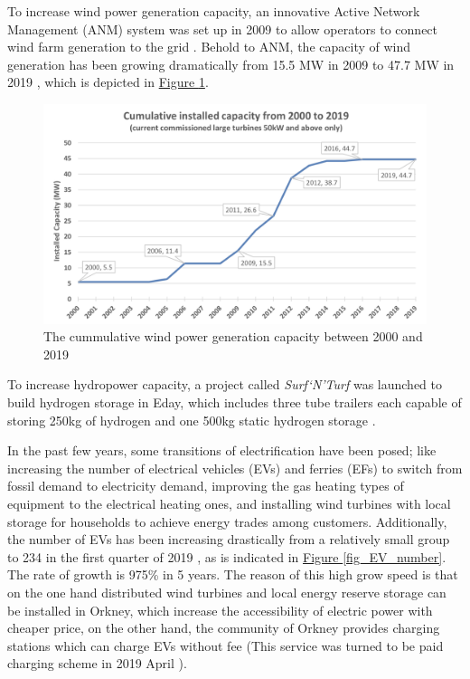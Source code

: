 \documentclass[12pt,a4paper]{report}
\begin{document}
        To increase wind power generation capacity, an innovative Active Network Management (ANM) system was set up in 2009 to allow operators to connect wind farm generation to the grid \cite{website:ANM}. 
        Behold to ANM, the capacity of wind generation has been growing dramatically from 15.5 MW in 2009 to 47.7 MW in 2019 \cite{report:OrkneyAudit}, which is depicted in \hyperref[fig_cummulative_wind_capacity]{Figure \ref*{fig_cummulative_wind_capacity}}. 
        
        \begin{figure}[ht]
            \centerline{\includegraphics[scale=1]{cummulativewindcapacity}}
            \caption{The cummulative wind power generation capacity between 2000 and 2019}
            \label{fig_cummulative_wind_capacity}
        \end{figure}

        To increase hydropower capacity, a project called \emph{Surf`N'Turf} was launched to build hydrogen storage in Eday, 
        which includes three tube trailers each capable of storing 250kg of hydrogen and one 500kg static hydrogen storage \cite{website:surfturf}. 

        In the past few years, some transitions of electrification have been posed; 
        like increasing the number of electrical vehicles (EVs) and ferries (EFs) to switch 
        from fossil demand to electricity demand, improving the gas heating types of 
        equipment to the electrical heating ones, and installing wind turbines with local 
        storage for households to achieve energy trades among customers. 
        Additionally, the number of EVs has been increasing drastically from a relatively small group to 234 in the first quarter of 2019 \cite{report:OrkneyAudit}, as is indicated in \hyperref[fig_EV_number]{Figure \ref*{fig_EV_number}}.
        The rate of growth is 975\% in 5 years. The reason of this high grow speed is that on the one hand distributed wind turbines and local energy reserve storage can be installed in Orkney, which increase the accessibility of electric power with cheaper price, on the other hand, the community of Orkney provides charging stations which can charge EVs without fee (This service was turned to be paid charging scheme in 2019 April \cite{report:OrkneyAudit}).
\end{document}
